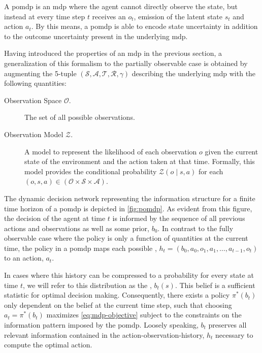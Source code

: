 A \acf{pomdp} is an \ac{mdp} where the agent cannot directly observe the state,
but instead at every time step $t$ receives an  $o_t$,
emission of the latent state $s_t$ and action $a_t$. By this means,
a \ac{pomdp} is able to encode state uncertainty in addition to the outcome
uncertainty present in the underlying \ac{mdp}.

Having introduced the properties of an \ac{mdp} in the previous section,
a generalization of this formalism to the partially observable case is obtained
by augmenting the 5-tuple $(\mathcal{S}, \mathcal{A}, \mathcal{T}, \mathcal{R},
\gamma)$ describing the underlying \ac{mdp} with the following quantities:

\begin{description}
  \item[Observation Space $\mathcal{O}$.] The set of all possible observations.
  \item[Observation Model $\mathcal{Z}$.] A model to represent the likelihood
    of each observation $o$ given the current state of the environment and the
    action taken at that time. Formally, this model provides the
    conditional probability $\mathcal{Z}(o \mid s, a)$ for each $(o, s, a) \in
    (\mathcal{O} \times \mathcal{S} \times \mathcal{A})$.
\end{description}

The dynamic decision network representing the information structure for
a finite time horizon of a \ac{pomdp} is depicted in
\cref{fig:pomdp}. As evident from this figure, the decision
of the agent at time $t$ is informed by the sequence of all previous actions
and observations as well as some prior, $b_0$. In contrast to the fully
observable case where the policy is only a function of quantities at the
current time, the policy in a \ac{pomdp} maps each possible ,
$h_t = (b_0, a_0, o_1, a_1, \dots, a_{t-1}, o_t)$ to an action, $a_t$.

In cases where this history can be compressed to a probability for
every state at time $t$, we will refer to this distribution as the
, $b_t(s)$. This belief is a sufficient statistic for optimal
decision making. Consequently, there exists a policy $\pi^*(b_t)$ only
dependent on the belief at the current time step, such that choosing $a_t
= \pi^*(b_t)$ maximizes \cref{eq:mdp-objective} subject to the constraints on
the information pattern imposed by the \ac{pomdp}. Loosely speaking,
$b_t$ preserves all relevant information contained in the
action-observation-history, $h_t$ necessary to compute the optimal action.

